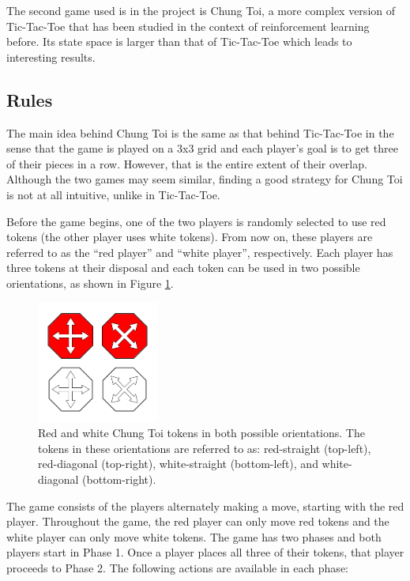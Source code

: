\documentclass[11pt,a4paper]{report}
\begin{document}
The second game used is in the project is Chung Toi, a more complex version of Tic-Tac-Toe that has been studied in the context of reinforcement learning before. Its state space is larger than that of Tic-Tac-Toe which leads to interesting results.


\subsection{Rules}

The main idea behind Chung Toi \cite{chung-toi-rules} is the same as that behind Tic-Tac-Toe in the sense that the game is played on a 3x3 grid and each player's goal is to get three of their pieces in a row. However, that is the entire extent of their overlap. Although the two games may seem similar, finding a good strategy for Chung Toi is not at all intuitive, unlike in Tic-Tac-Toe.

Before the game begins, one of the two players is randomly selected to use red tokens (the other player uses white tokens). From now on, these players are referred to as the ``red player'' and ``white player'', respectively. Each player has three tokens at their disposal and each token can be used in two possible orientations, as shown in Figure \ref{chung-toi-tokens}.

\begin{figure}[htbp]
	\begin{center}
		\includegraphics[width=40mm]{chung_toi_tokens.png}
		\caption[Chung Toi tokens]{Red and white Chung Toi tokens in both possible orientations. The tokens in these orientations are referred to as: red-straight (top-left), red-diagonal (top-right), white-straight (bottom-left), and white-diagonal (bottom-right).}
		\label{chung-toi-tokens}
	\end{center}
\end{figure}

The game consists of the players alternately making a move, starting with the red player. Throughout the game, the red player can only move red tokens and the white player can only move white tokens. The game has two phases and both players start in Phase 1. Once a player places all three of their tokens, that player proceeds to Phase 2. The following actions are available in each phase:
\end{document}
